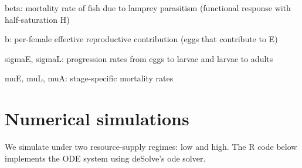 \documentclass[
]{article}
\begin{document}
beta: mortality rate of fish due to lamprey parasitism (functional
response with half-saturation H)

b: per-female effective reproductive contribution (eggs that contribute
to E)

sigmaE, sigmaL: progression rates from eggs to larvae and larvae to
adults

muE, muL, muA: stage-specific mortality rates

\section{Numerical simulations}\label{numerical-simulations}

We simulate under two resource-supply regimes: low and high. The R code
below implements the ODE system using deSolve's ode solver.
\end{document}
